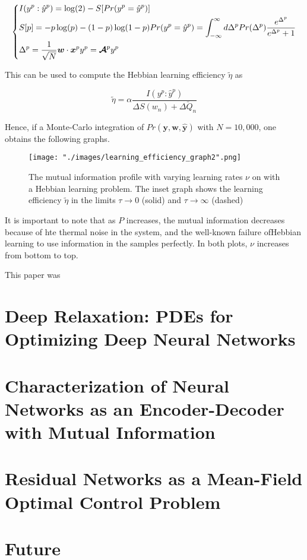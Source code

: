 \begin{equation*}
\begin{dcases}
I(y^p:\hat{y}^p) = \log(2) - S[Pr(y^p = \hat{y}^p)] \\
S[p] = -p \log(p) - (1-p) \log(1-p)
Pr(y^p = \hat{y}^p) = \int_{-\infty}^\infty d\Delta^p Pr(\Delta^p) \frac{e^{\Delta^p}}{e^{\Delta^p} + 1} \\
\Delta^p = \frac{1}{\sqrt{N}} \bm{w} \cdot \bm{x}^p y^p = \bm{\mathcal{A}}^p y^p
\end{dcases}
\end{equation*}

This can be used to compute the Hebbian learning efficiency $\tilde{\eta}$ as

$$\tilde{\eta} = \alpha \frac{I(y^p:\hat{y}^p)}{\Delta S(w_n) + \bar{\Delta Q_n}}$$

Hence, if a Monte-Carlo integration of $Pr(\bm{y},\bm{w},\hat{\bm{y}})$ with $N=10,000$, one obtains the following graphs.
\begin{figure}[h]
\begin{center}
    \texttt{[image: "./images/learning\_efficiency\_graph2".png]}
    \caption{The mutual information profile with varying learning rates $\nu$ on with a Hebbian learning problem. The inset graph shows the learning efficiency $\tilde{\eta}$ in the limits $\tau \rightarrow 0$ (solid) and $\tau \rightarrow \infty$ (dashed)}
    \label{fig::learning_efficiency}
\end{center}
\end{figure}

It is important to note that as $P$ increases, the mutual information decreases because of hte thermal noise in the system, and the well-known failure ofHebbian learning to use information in the samples perfectly. In both plots, $\nu$ increases from bottom to top.

This paper was

\section{Deep Relaxation: PDEs for Optimizing Deep Neural Networks \cite{deeprelaxation}}

\section{Characterization of Neural Networks as an Encoder-Decoder with Mutual Information \cite{blackbox}}

\section{Residual Networks as a Mean-Field Optimal Control Problem \cite{meanfield}}


\section{Future}
